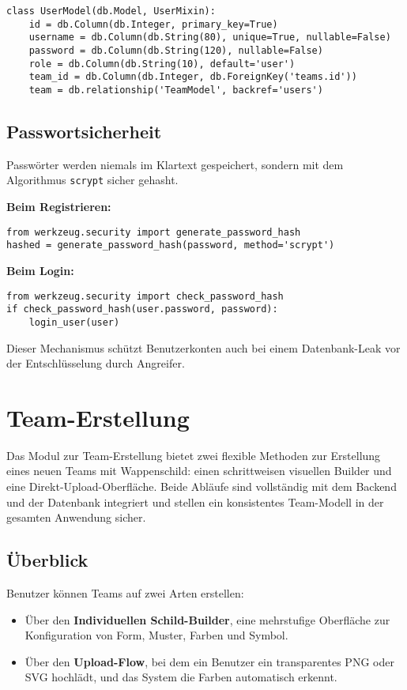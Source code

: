 \documentclass[12pt]{article}
\begin{document}
\begin{verbatim}
class UserModel(db.Model, UserMixin):
    id = db.Column(db.Integer, primary_key=True) 
    username = db.Column(db.String(80), unique=True, nullable=False) 
    password = db.Column(db.String(120), nullable=False)  
    role = db.Column(db.String(10), default='user') 
    team_id = db.Column(db.Integer, db.ForeignKey('teams.id')) 
    team = db.relationship('TeamModel', backref='users') 
\end{verbatim}

\subsection{Passwortsicherheit}

Passwörter werden niemals im Klartext gespeichert, sondern mit dem Algorithmus \texttt{scrypt} sicher gehasht. 

\noindent \textbf{Beim Registrieren:}
\begin{verbatim}
from werkzeug.security import generate_password_hash
hashed = generate_password_hash(password, method='scrypt')
\end{verbatim}

\noindent \textbf{Beim Login:}
\begin{verbatim}
from werkzeug.security import check_password_hash
if check_password_hash(user.password, password):
    login_user(user)
\end{verbatim}

\noindent Dieser Mechanismus schützt Benutzerkonten auch bei einem Datenbank-Leak vor der Entschlüsselung durch Angreifer.


\newpage
\section{Team-Erstellung}

Das Modul zur Team-Erstellung bietet zwei flexible Methoden zur Erstellung eines neuen Teams mit Wappenschild: einen schrittweisen visuellen Builder und eine Direkt-Upload-Oberfläche. Beide Abläufe sind vollständig mit dem Backend und der Datenbank integriert und stellen ein konsistentes Team-Modell in der gesamten Anwendung sicher.

\subsection{Überblick}

Benutzer können Teams auf zwei Arten erstellen:
\begin{itemize}
    \item Über den \textbf{Individuellen Schild-Builder}, eine mehrstufige Oberfläche zur Konfiguration von Form, Muster, Farben und Symbol.
    \item Über den \textbf{Upload-Flow}, bei dem ein Benutzer ein transparentes PNG oder SVG hochlädt, und das System die Farben automatisch erkennt.
\end{itemize}
\end{document}
